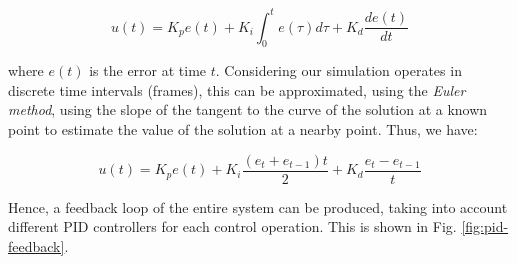 \documentclass[12pt]{article}
\begin{document}
\begin{equation}
    u(t) = K_p e(t) + K_i \int_0^t e(\tau) d\tau + K_d \frac{de(t)}{dt}
\end{equation}

where $e(t)$ is the error at time $t$. Considering our simulation operates in discrete time intervals (frames), this can be approximated, using the \emph{Euler method}, using the slope of the tangent to the curve of the solution at a known point to estimate the value of the solution at a nearby point. Thus, we have:

\begin{equation}
    u(t) = K_p e(t) + K_i \frac{(e_t+e_{t-1})t}{2} + K_d \frac{e_t-e_{t-1}}{t}
\end{equation}

Hence, a feedback loop of the entire system can be produced, taking into account different PID controllers for each control operation. This is shown in Fig. \ref{fig:pid-feedback}.
\end{document}

